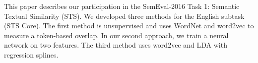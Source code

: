 This paper describes our participation in the SemEval-2016 Task 1: Semantic Textual Similarity (STS). We developed three methods for the English subtask (STS Core). The first method is unsupervised and uses WordNet and word2vec to measure a token-based overlap. In our second approach, we train a neural network on two features. The third method uses word2vec and LDA with regression splines.
